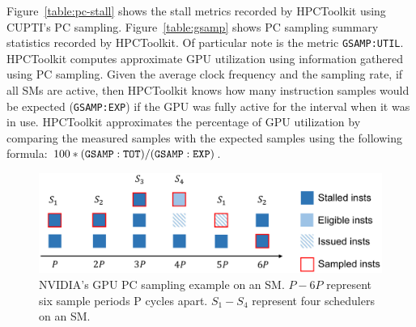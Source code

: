 Figure~\ref{table:pc-stall} shows the stall metrics recorded by HPCToolkit using CUPTI's PC sampling. Figure~\ref{table:gsamp} shows PC sampling summary statistics recorded by HPCToolkit. Of particular note is the metric \verb|GSAMP:UTIL|. HPCToolkit computes approximate GPU utilization using information gathered using PC sampling. Given the average clock frequency and the sampling rate, if all SMs are active, then HPCToolkit knows how many instruction samples would be expected ({\tt GSAMP:EXP}) if the GPU was fully active for the interval when it was in use. HPCToolkit approximates the percentage of GPU utilization by comparing the measured samples with the expected samples using the following formula: $100 * {\tt (GSAMP:TOT)/ (GSAMP:EXP)}$.


\begin{figure}[t]
\includegraphics[width=\textwidth]{mental-model.pdf}
\caption{NVIDIA's GPU PC sampling example on an SM. $P-6P$ represent
six sample periods P cycles apart. $S_{1}-S_{4}$ represent four schedulers on an SM.}
\label{fig:pc sampling}
\vspace{-2ex}
\end{figure}

